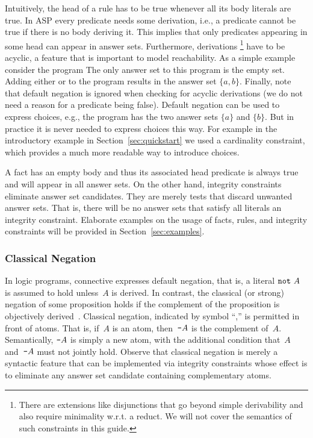 Intuitively, the head of a rule has to be true whenever all its body literals are true.
In ASP every predicate needs some derivation, i.e., 
a predicate cannot be true if there is no body deriving it.
This implies that only predicates appearing in some head can appear in answer sets.
Furthermore, derivations
\footnote{There are extensions like disjunctions 
that go beyond simple derivability and also require minimality w.r.t. a reduct. 
We will not cover the semantics of such constraints in this guide.}%
have to be acyclic,
a feature that is important to model reachability.
As a simple example consider the program 
The only answer set to this program is the empty set.
Adding either  or  to the program results in the answer set $\{a,b\}$.
Finally, note that default negation is ignored when checking for acyclic derivations 
(we do not need a reason for a predicate being false).
Default negation can be used to express choices, e.g., the program  
has the two answer sets $\{a\}$ and $\{b\}$.
But in practice it is never needed to express choices this way.
For example in the introductory example in Section~\ref{sec:quickstart} we used a cardinality 
constraint, which provides a much more readable way to introduce choices.

A fact has an empty body and thus its associated head predicate is always true 
and will appear in all answer sets.
On the other hand, integrity constraints eliminate answer set candidates.
They are merely tests that discard unwanted answer sets.
That is, there will be no answer sets that satisfy all literals an integrity constraint.
Elaborate examples on the usage of facts, rules, and integrity constraints
will be provided in Section~\ref{sec:examples}.

\subsubsection{Classical Negation}\label{subsec:gringo:negation}

In logic programs, connective  expresses default negation,
that is, a literal $\texttt{not}~A$ is assumed to hold unless~$A$ is derived.
In contrast, the classical (or strong) negation of some proposition
holds if the complement of the proposition is objectively derived~\cite{gellif91a}.
Classical negation, indicated by symbol ``\code{-},'' is permitted in front of atoms.
That is, if~$A$ is an atom, then~$\texttt{-}A$ is the complement of~$A$.
Semantically, $\texttt{-}A$ is simply a new atom,
with the additional condition that~$A$ and~$\texttt{-}A$ must not jointly hold.
Observe that classical negation is merely a syntactic feature that can be
implemented via integrity constraints whose effect is to eliminate
any answer set candidate containing complementary atoms.

